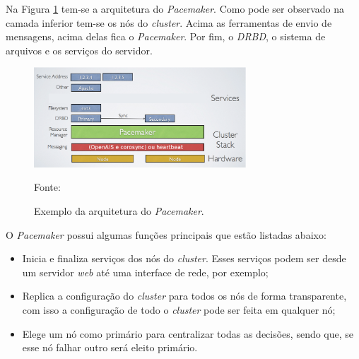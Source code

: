 Na Figura \ref{fig:pacemaker_tools} tem-se a arquitetura do \textit{Pacemaker}. Como pode ser observado na camada inferior tem-se os nós do 
\textit{cluster}. Acima as ferramentas de envio de mensagens, acima delas fica o \textit{Pacemaker}. Por fim, o \textit{DRBD}, o sistema de 
arquivos e os serviços do servidor.

\begin{figure}[h!]
 \centering
 \includegraphics[width=300px]{img/pacemaker_tools.eps}
 \caption{Exemplo da arquitetura do \textit{Pacemaker}.}
 Fonte: \citet{pacemaker}
 \label{fig:pacemaker_tools}
\end{figure}

O \textit{Pacemaker} possui algumas funções principais que estão listadas abaixo:
\begin{itemize}
 \item Inicia e finaliza serviços dos nós do \textit{cluster}. Esses serviços podem ser desde um servidor \textit{web} até uma interface de 
 rede, por exemplo;
 \item Replica a configuração do \textit{cluster} para todos os nós de forma transparente, com isso a configuração de todo o \textit{cluster} 
 pode ser feita em qualquer nó;
 \item Elege um nó como primário para centralizar todas as decisões, sendo que, se esse nó falhar outro será eleito primário.
\end{itemize}

